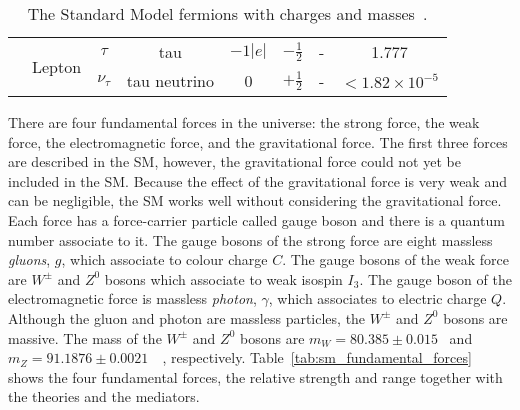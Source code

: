 \begin{table}[htp]
{\begin{tabular}{cccccccc}
                                 & \multirow{2}{*}{Lepton} & $\tau$       & tau               & $-1|e|$             & $-\frac{1}{2}$       & -                 & 1.777\\
                                 &                         & $\nu_{\tau}$ & tau neutrino      & 0                   & $+\frac{1}{2}$       & -                 & $< 1.82 \times 10^{-5}$\\
            \hline
            \hline
        \end{tabular}
    }
    \caption{The Standard Model fermions with charges and masses~\cite{Patrignani:2016xqp}.}
    \label{tab:sm_fermions}
\end{table}%


There are four fundamental forces in the universe: the strong force, the weak force, the electromagnetic force, and the gravitational force.
The first three forces are described in the SM, however, the gravitational force could not yet be included in the SM.
Because the effect of the gravitational force is very weak and can be negligible, the SM works well without considering the gravitational force.
Each force has a force-carrier particle called gauge boson and there is a quantum number associate to it.
The gauge bosons of the strong force are eight massless \textit{gluons}, $g$, which associate to colour charge $C$.
The gauge bosons of the weak force are $W^{\pm}$ and $Z^{0}$ bosons which associate to weak isospin $I_{3}$.
The gauge boson of the electromagnetic force is massless \textit{photon}, $\gamma$, which associates to electric charge $Q$.
Although the gluon and photon are massless particles, the $W^{\pm}$ and $Z^{0}$ bosons are massive.
The mass of the $W^{\pm}$ and $Z^{0}$ bosons are $m_{W}=80.385 \pm 0.015$~{\GeV} and $m_{Z}=91.1876 \pm 0.0021$~{\GeV}~\cite{Patrignani:2016xqp}, respectively.
Table~\ref{tab:sm_fundamental_forces} shows the four fundamental forces, the relative strength and range together with the theories and the mediators.

